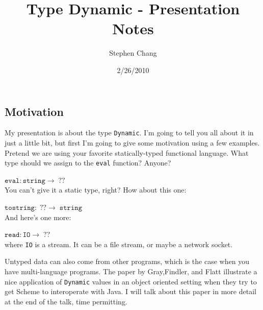 \documentclass[12pt]{article}	%
\begin{document}
\newcommand{\Dynamic}{\texttt{Dynamic}\xspace}
\newcommand{\typecase}{\texttt{typecase}\xspace}
\newcommand{\dynamic}{\texttt{dynamic}\xspace}
\newcommand{\wrong}{\texttt{wrong}\xspace}
\newcommand{\deno}[1]{ \ensuremath{[\![#1]\!]} }
\newcommand{\code}[1]{$\mathtt{#1}$}
\newcommand{\pair}[2]{ \ensuremath{\left\langle #1,#2 \right\rangle} }
\newcommand{\pairtt}[2]{ \ensuremath{\left\langle \mathtt{#1,#2} \right\rangle} }
\newcommand{\dyn}[2]{ \ensuremath{ \pairtt{v}{\tau}_\texttt{Dyn} } }

\newcommand{\eval}{ \ensuremath{\Rightarrow} }

\title{Type Dynamic - Presentation Notes}
\author{Stephen Chang}
\date{2/26/2010}
\maketitle

\subsection*{Motivation}
My presentation is about the type \Dynamic. I'm going to tell you all about it in just a little bit, but first I'm going to give some motivation using a few examples. Pretend we are using your favorite statically-typed functional language. What type should we assign to the \texttt{eval} function? Anyone?

$\;$\\
\code{eval:string\rightarrow\;??}
$\;$\\

\noindent You can't give it a static type, right? How about this one:

$\;$\\
\code{tostring:\;??\rightarrow\;string}
$\;$\\

\noindent And here's one more:

$\;$\\
\code{read:IO\rightarrow\;??}
$\;$\\

\noindent where \texttt{IO} is a stream. It can be a file stream, or maybe a network socket.

Untyped data can also come from other programs, which is the case when you have multi-language programs. The paper by Gray,Findler, and Flatt illustrate a nice application of \Dynamic values in an object oriented setting when they try to get Scheme to interoperate with Java. I will talk about this paper in more detail at the end of the talk, time permitting.
\end{document}
